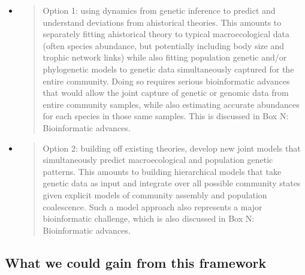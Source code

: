 \documentclass[]{article}
\begin{document}
\begin{itemize}
\item
  \begin{quote}
  Option 1: using dynamics from genetic inference to predict and
  understand deviations from ahistorical theories. This amounts to
  separately fitting ahistorical theory to typical macroecological data
  (often species abundance, but potentially including body size and
  trophic network links) while also fitting population genetic and/or
  phylogenetic models to genetic data simultaneously captured for the
  entire community. Doing so requires serious bioinformatic advances
  that would allow the joint capture of genetic or genomic data from
  entire community samples, while also estimating accurate abundances
  for each species in those same samples. This is discussed in Box N:
  Bioinformatic advances.
  \end{quote}
\item
  \begin{quote}
  Option 2: building off existing theories, develop new joint models
  that simultaneously predict macroecological and population genetic
  patterns. This amounts to building hierarchical models that take
  genetic data as input and integrate over all possible community states
  given explicit models of community assembly and population
  coalescence. Such a model approach also represents a major
  bioinformatic challenge, which is also discussed in Box N:
  Bioinformatic advances.
  \end{quote}
\end{itemize}

\subsection{What we could gain from this
framework}\label{what-we-could-gain-from-this-framework}
\end{document}
